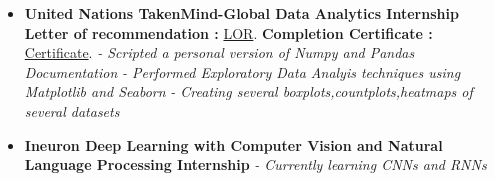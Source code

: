 \documentclass[a4paper,12pt]{article}
\begin{document}
\begin{itemize}
    \item{\textbf{\large{United Nations TakenMind-Global Data Analytics Internship}}
          \newline
          \textbf{Letter of recommendation :} \href{https://github.com/teetangh/Kaustav-All-Certifications/blob/master/Artificial%20Intelligence/UN%20Takenmind%20Data%20Analytics%20Internship/35799-KaustavGhosh-recommendation-letter.pdf}{LOR}.
          \textbf{Completion Certificate :} \href{https://github.com/teetangh/Kaustav-All-Certifications/blob/master/Artificial%20Intelligence/UN%20Takenmind%20Data%20Analytics%20Internship/35799-KaustavGhosh.pdf}{Certificate}.
              \newline
              \textit{- Scripted a personal version of Numpy and Pandas Documentation }
              \newline
              \textit{- Performed Exploratory Data Analyis techniques using Matplotlib and Seaborn }
              \newline
              \textit{- Creating several boxplots,countplots,heatmaps of several datasets}}
\end{itemize}
\begin{itemize}
    \item{\textbf{\large{Ineuron Deep Learning with Computer Vision and Natural Language Processing Internship}}
          \newline
          \textit{- Currently learning CNNs and RNNs }}
\end{itemize}



\pagebreak
\end{document}
